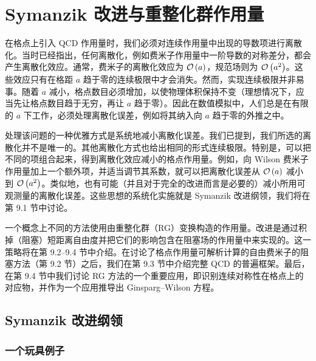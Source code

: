 
\chapter{Symanzik 改进与重整化群作用量}

在格点上引入 QCD 作用量时，我们必须对连续作用量中出现的导数项进行离散化。当时已经指出，任何离散化，例如费米子作用量中一阶导数的对称差分，都会产生离散化效应。通常，费米子的离散化效应为 $\mathcal{O}\left(a\right)$，规范场则为 $\mathcal{O}\left(a^2\right)$。这些效应只有在格距 $a$ 趋于零的连续极限中才会消失。然而，实现连续极限并非易事。随着 $a$ 减小，格点数目必须增加，以使物理体积保持不变（理想情况下，应当先让格点数目趋于无穷，再让 $a$ 趋于零）。因此在数值模拟中，人们总是在有限的 $a$ 下工作，必须处理离散化误差，例如将其纳入向 $a$ 趋于零的外推之中。

处理该问题的一种优雅方式是系统地减小离散化误差。我们已提到，我们所选的离散化并不是唯一的。其他离散化方式也给出相同的形式连续极限。特别是，可以把不同的项组合起来，得到离散化效应减小的格点作用量。例如，向 Wilson 费米子作用量加上一个额外项，并适当调节其系数，就可以把离散化误差从 $\mathcal{O}\left(a\right)$ 减小到 $\mathcal{O}\left(a^2\right)$。类似地，也有可能（并且对于完全的改进而言是必要的）减小所用可观测量的离散化误差。这些思想的系统化实施就是 Symanzik 改进纲领，我们将在第 9.1 节中讨论。

一个概念上不同的方法使用由重整化群（RG）变换构造的作用量。改进是通过积掉（阻塞）短距离自由度并把它们的影响包含在阻塞场的作用量中来实现的。这一策略将在第 9.2--9.4 节中介绍。在讨论了格点作用量可解析计算的自由费米子的阻塞方法（第 9.2 节）之后，我们在第 9.3 节中介绍完整 QCD 的普遍框架。最后，在第 9.4 节中我们讨论 RG 方法的一个重要应用，即识别连续对称性在格点上的对应物，并作为一个应用推导出 Ginsparg--Wilson 方程。

\section{Symanzik 改进纲领}
\label{sec:9.1}

\subsection{一个玩具例子}
\label{sec:9.1.1}

